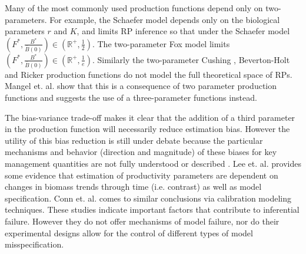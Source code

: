 \documentclass[12pt]{ucscthesis}
\begin{document}
%
Many of the most commonly used production functions depend only
on two-parameters. For example, the Schaefer model %
depends only on the biological parameters $r$ and $K$, and limits RP inference
so that under the Schaefer model $\left(F^*, \frac{B^*}{\bar B(0)}\right)\in \left(\mathbb{R}^+, \frac{1}{2}\right)$.
The two-parameter Fox model \cite{fox_jr_exponential_1970} limits $\left(F^*, \frac{B^*}{\bar B(0)}\right)\in \left(\mathbb{R}^+, \frac{1}{e}\right)$.
Similarly the two-parameter Cushing \cite{cushing_dependence_1971, cushing_dependence_1973}, Beverton-Holt \cite[BH]{beverton_dynamics_1957}
and Ricker \cite{ricker_stock_1954} production functions do not model the full theoretical space of
RPs. Mangel et. al. \cite{mangel_perspective_2013} show that this is a 
consequence of two parameter production functions and suggests the use of a 
three-parameter functions instead. 

%
The bias-variance trade-off \cite{ramasubramanian_machine_2017} makes it
clear that the addition of a third parameter in the production function will
necessarily reduce estimation bias. However the utility of this bias reduction
is still under debate because the particular mechanisms and behavior (direction and magnitude) %
of these biases for key management quantities %
are not fully understood or described \cite{munyandorero_analytical_2023}. Lee et. al. \cite{lee_can_2012} provides some
evidence that estimation of productivity parameters %
are dependent on changes in biomass trends through time (i.e. contrast) as well %
as model specification. Conn et. al. \cite{conn_when_2010} comes to similar conclusions %
via calibration modeling techniques. These studies indicate important factors that
contribute to inferential failure. However they do not offer mechanisms of model
failure, nor do their experimental designs allow for the control of different
types of model misspecification.
\end{document}
